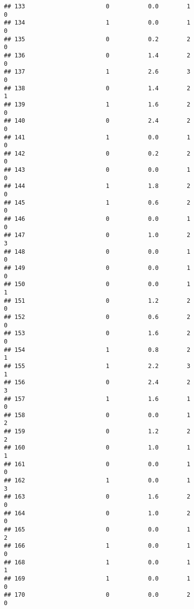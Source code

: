 \documentclass[]{article}
\begin{document}
\begin{verbatim}
## 133                       0           0.0        1                 0
## 134                       1           0.0        1                 0
## 135                       0           0.2        2                 0
## 136                       0           1.4        2                 0
## 137                       1           2.6        3                 0
## 138                       0           1.4        2                 1
## 139                       1           1.6        2                 0
## 140                       0           2.4        2                 0
## 141                       1           0.0        1                 0
## 142                       0           0.2        2                 0
## 143                       0           0.0        1                 0
## 144                       1           1.8        2                 0
## 145                       1           0.6        2                 0
## 146                       0           0.0        1                 0
## 147                       0           1.0        2                 3
## 148                       0           0.0        1                 0
## 149                       0           0.0        1                 0
## 150                       0           0.0        1                 1
## 151                       0           1.2        2                 0
## 152                       0           0.6        2                 0
## 153                       0           1.6        2                 0
## 154                       1           0.8        2                 1
## 155                       1           2.2        3                 1
## 156                       0           2.4        2                 3
## 157                       1           1.6        1                 0
## 158                       0           0.0        1                 2
## 159                       0           1.2        2                 2
## 160                       0           1.0        1                 1
## 161                       0           0.0        1                 0
## 162                       1           0.0        1                 3
## 163                       0           1.6        2                 0
## 164                       0           1.0        2                 0
## 165                       0           0.0        1                 2
## 166                       1           0.0        1                 0
## 168                       1           0.0        1                 1
## 169                       1           0.0        1                 0
## 170                       0           0.0        2                 0

\end{verbatim}
\end{document}
